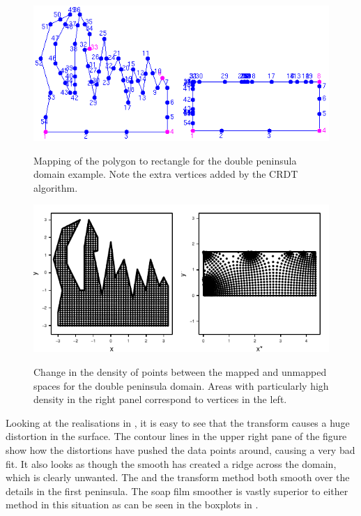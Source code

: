 \begin{figure}
\centering
\includegraphics{sc/figs/wigglytop2-numbered.png} \\
\caption{Mapping of the polygon to rectangle for the double peninsula domain example. Note the extra vertices added by the CRDT algorithm.}
\label{wigglytop2-numbered}
\end{figure}

\begin{figure}
\centering
\includegraphics{sc/figs/wt2-points.pdf} \\
\caption{Change in the density of points between the mapped and unmapped spaces for the double peninsula domain. Areas with particularly high density in the right panel correspond to vertices in the left.}
\label{wt2-points}
\end{figure}

Looking at the realisations in , it is easy to see that the \sch transform causes a huge distortion in the surface. The contour lines in the upper right pane of the figure show how the distortions have pushed the data points around, causing a very bad fit. It also looks as though the smooth has created a ridge across the domain, which is clearly unwanted. The \tprs and the transform method both smooth over the details in the first peninsula. The soap film smoother is vastly superior to either method in this situation as can be seen in the boxplots in .

